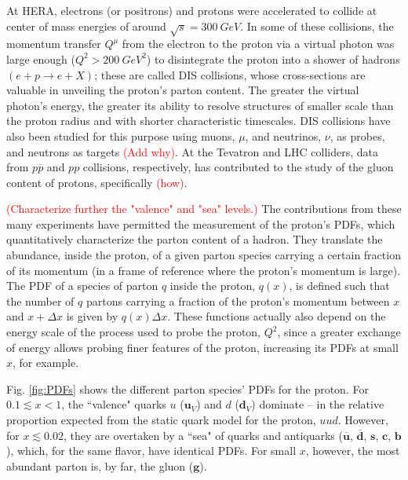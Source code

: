 At HERA, electrons (or positrons) and protons were accelerated to collide at center of mass energies of around $\sqrt{s} = \qty{300}{GeV}$. In some of these collisions, the momentum transfer $Q^\mu$ from the electron to the proton via a virtual photon was large enough ($Q^2 > \qty{200}{GeV^2}$) to disintegrate the proton into a shower of hadrons $(e  + p \to e + X)$; these are called \gls{DIS} collisions, whose cross-sections are valuable in unveiling the proton's parton content. The greater the virtual photon's energy, the greater its ability to resolve structures of smaller scale than the proton radius and with shorter characteristic timescales. \gls{DIS} collisions have also been studied for this purpose using muons, $\mu$, and neutrinos, $\nu$, as probes, and neutrons as targets \textcolor{red}{(Add why)}. At the Tevatron and LHC colliders, data from $p\overline{p}$ and $pp$ collisions, respectively, has contributed to the study of the gluon content of protons, specifically \textcolor{red}{(how)}. \cite{Thomson:2013zua}\cite{ParticleDataGroup:2024cfk}

\textcolor{red}{(Characterize further the "valence" and "sea" levels.)} The contributions from these many experiments have permitted the measurement of the proton's \glspl{PDF}, which quantitatively characterize the parton content of a hadron. They translate the abundance, inside the proton, of a given parton species carrying a certain fraction of its momentum (in a frame of reference where the proton's momentum is large). The \gls{PDF} of a species of parton $q$ inside the proton, $q(x)$, is defined such that the number of $q$ partons carrying a fraction of the proton's momentum between $x$ and $x + \Delta x$ is given by $q(x)\Delta x$. These functions actually also depend on the energy scale of the process used to probe the proton, $Q^2$, since a greater exchange of energy allows probing finer features of the proton, increasing its \glspl{PDF} at small $x$, for example. \cite{Thomson:2013zua}

Fig. \ref{fig:PDFs} shows the different parton species' \glspl{PDF} for the proton. For $0.1 \lesssim x < 1$, the ``valence" quarks $u$ ($\mathbf{u}_V$) and $d$ ($\mathbf{d}_V$) dominate -- in the relative proportion expected from the static quark model for the proton, $uud$. However, for $x \lesssim 0.02$, they are overtaken by a ``sea" of quarks and antiquarks ($\overline{\mathbf{u}}$, $\overline{\mathbf{d}}$, $\mathbf{s}$, $\mathbf{c}$, $\mathbf{b}$), which, for the same flavor, have identical \glspl{PDF}. For small $x$, however, the most abundant parton is, by far, the gluon ($\mathbf{g}$).

